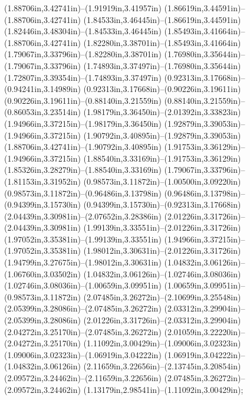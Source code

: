 (1.88706in,3.42741in)--(1.91919in,3.41957in) (1.86619in,3.44591in)--(1.88706in,3.42741in) (1.84533in,3.46445in)--(1.86619in,3.44591in) (1.82446in,3.48304in)--(1.84533in,3.46445in) (1.85493in,3.41664in)--(1.88706in,3.42741in) (1.82280in,3.38701in)--(1.85493in,3.41664in) (1.79067in,3.33796in)--(1.82280in,3.38701in) (1.76980in,3.35644in)--(1.79067in,3.33796in) (1.74893in,3.37497in)--(1.76980in,3.35644in) (1.72807in,3.39354in)--(1.74893in,3.37497in) (0.92313in,3.17668in)--(0.94241in,3.14989in) (0.92313in,3.17668in)--(0.90226in,3.19611in) (0.90226in,3.19611in)--(0.88140in,3.21559in) (0.88140in,3.21559in)--(0.86053in,3.23514in) (1.98179in,3.36450in)--(2.01392in,3.33823in) (1.94966in,3.37215in)--(1.98179in,3.36450in) (1.92879in,3.39053in)--(1.94966in,3.37215in) (1.90792in,3.40895in)--(1.92879in,3.39053in) (1.88706in,3.42741in)--(1.90792in,3.40895in) (1.91753in,3.36129in)--(1.94966in,3.37215in) (1.88540in,3.33169in)--(1.91753in,3.36129in) (1.85326in,3.28279in)--(1.88540in,3.33169in) (1.79067in,3.33796in)--(1.81153in,3.31952in) (0.98573in,3.11872in)--(1.00500in,3.09220in) (0.98573in,3.11872in)--(0.96486in,3.13798in) (0.96486in,3.13798in)--(0.94399in,3.15730in) (0.94399in,3.15730in)--(0.92313in,3.17668in) (2.04439in,3.30981in)--(2.07652in,3.28386in) (2.01226in,3.31726in)--(2.04439in,3.30981in) (1.99139in,3.33551in)--(2.01226in,3.31726in) (1.97052in,3.35381in)--(1.99139in,3.33551in) (1.94966in,3.37215in)--(1.97052in,3.35381in) (1.98012in,3.30631in)--(2.01226in,3.31726in) (1.94799in,3.27675in)--(1.98012in,3.30631in) (1.04832in,3.06126in)--(1.06760in,3.03502in) (1.04832in,3.06126in)--(1.02746in,3.08036in) (1.02746in,3.08036in)--(1.00659in,3.09951in) (1.00659in,3.09951in)--(0.98573in,3.11872in) (2.07485in,3.26272in)--(2.10699in,3.25548in) (2.05399in,3.28086in)--(2.07485in,3.26272in) (2.03312in,3.29904in)--(2.05399in,3.28086in) (2.01226in,3.31726in)--(2.03312in,3.29904in) (2.04272in,3.25170in)--(2.07485in,3.26272in) (2.01059in,3.22220in)--(2.04272in,3.25170in) (1.11092in,3.00429in)--(1.09006in,3.02323in) (1.09006in,3.02323in)--(1.06919in,3.04222in) (1.06919in,3.04222in)--(1.04832in,3.06126in) (2.11659in,3.22656in)--(2.13745in,3.20854in) (2.09572in,3.24462in)--(2.11659in,3.22656in) (2.07485in,3.26272in)--(2.09572in,3.24462in) (1.13179in,2.98541in)--(1.11092in,3.00429in);
